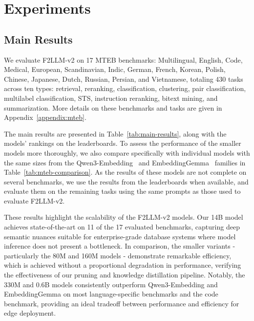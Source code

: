 \section{Experiments}

\subsection{Main Results}



We evaluate F2LLM-v2 on 17 MTEB benchmarks: Multilingual, English, Code, Medical, European, Scandinavian, Indic, German, French, Korean, Polish, Chinese, Japanese, Dutch, Russian, Persian, and Vietnamese, totaling 430 tasks across ten types: retrieval, reranking, classification, clustering, pair classification, multilabel classification, STS, instruction reranking, bitext mining, and summarization. More details on these benchmarks and tasks are given in Appendix~\ref{appendix:mteb}.


The main results are presented in Table~\ref{tab:main-results}, along with the models' rankings on the leaderboards. To assess the performance of the smaller models more thoroughly, we also compare specifically with individual models with the same sizes from the Qwen3-Embedding~\citep{2025Qwen3-Embedding} and EmbeddingGemma~\citep{2025EmbeddingGemma} families in Table~\ref{tab:mteb-comparison}. As the results of these models are not complete on several benchmarks, we use the results from the leaderboards when available, and evaluate them on the remaining tasks using the same prompts as those used to evaluate F2LLM-v2.



These results highlight the scalability of the F2LLM-v2 models. Our 14B model achieves state-of-the-art on 11 of the 17 evaluated benchmarks, capturing deep semantic nuances suitable for enterprise-grade database systems where model inference does not present a bottleneck. In comparison, the smaller variants - particularly the 80M and 160M models - demonstrate remarkable efficiency, which is achieved without a proportional degradation in performance, verifying the effectiveness of our pruning and knowledge distillation pipeline. Notably, the 330M and 0.6B models consistently outperform Qwen3-Embedding and EmbeddingGemma on most language-specific benchmarks and the code benchmark, providing an ideal tradeoff between performance and efficiency for edge deployment.




